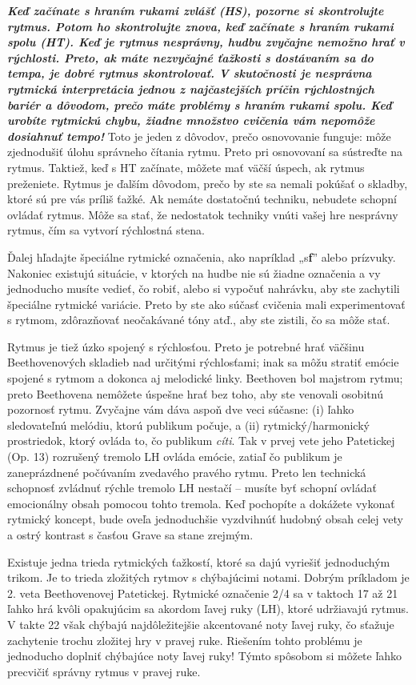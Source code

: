 \documentclass[11pt,a4paper%
]{book}
\begin{document}
\emph{\textbf{Keď začínate s hraním rukami zvlášť (HS), pozorne si skontrolujte rytmus. Potom ho skontrolujte znova, keď začínate s hraním rukami spolu (HT). Keď je rytmus nesprávny, hudbu zvyčajne nemožno hrať v rýchlosti. Preto, ak máte nezvyčajné ťažkosti s dostávaním sa do tempa, je dobré rytmus skontrolovať. V skutočnosti je nesprávna rytmická interpretácia jednou z najčastejších príčin rýchlostných bariér a dôvodom, prečo máte problémy s hraním rukami spolu. Keď urobíte rytmickú chybu, žiadne množstvo cvičenia vám nepomôže dosiahnuť tempo!}} Toto je jeden z dôvodov, prečo osnovovanie funguje: môže zjednodušiť úlohu správneho čítania rytmu. Preto pri osnovovaní sa sústreďte na rytmus. Taktiež, keď s HT začínate, môžete mať väčší úspech, ak rytmus preženiete. Rytmus je ďalším dôvodom, prečo by ste sa nemali pokúšať o skladby, ktoré sú pre vás príliš ťažké. Ak nemáte dostatočnú techniku, nebudete schopní ovládať rytmus. Môže sa stať, že nedostatok techniky vnúti vašej hre nesprávny rytmus, čím sa vytvorí rýchlostná stena.

Ďalej hľadajte špeciálne rytmické označenia, ako napríklad „s\textbf{f}” alebo prízvuky. Nakoniec existujú situácie, v ktorých na hudbe nie sú žiadne označenia a vy jednoducho musíte vedieť, čo robiť, alebo si vypočuť nahrávku, aby ste zachytili špeciálne rytmické variácie. Preto by ste ako súčasť cvičenia mali experimentovať s rytmom, zdôrazňovať neočakávané tóny atď., aby ste zistili, čo sa môže stať.

Rytmus je tiež úzko spojený s rýchlosťou. Preto je potrebné hrať väčšinu Beethovenových skladieb nad určitými rýchlosťami; inak sa môžu stratiť emócie spojené s rytmom a dokonca aj melodické linky. Beethoven bol majstrom rytmu; preto Beethovena nemôžete úspešne hrať bez toho, aby ste venovali osobitnú pozornosť rytmu. Zvyčajne vám dáva aspoň dve veci súčasne: (i) ľahko sledovateľnú melódiu, ktorú publikum počuje, a (ii) rytmický/harmonický prostriedok, ktorý ovláda to, čo publikum \emph{cíti}. Tak v prvej vete jeho Patetickej (Op. 13) rozrušený tremolo LH ovláda emócie, zatiaľ čo publikum je zaneprázdnené počúvaním zvedavého pravého rytmu. Preto len technická schopnosť zvládnuť rýchle tremolo LH nestačí -- musíte byť schopní ovládať emocionálny obsah pomocou tohto tremola. Keď pochopíte a dokážete vykonať rytmický koncept, bude oveľa jednoduchšie vyzdvihnúť hudobný obsah celej vety a ostrý kontrast s časťou Grave sa stane zrejmým.

Existuje jedna trieda rytmických ťažkostí, ktoré sa dajú vyriešiť jednoduchým trikom. Je to trieda zložitých rytmov s chýbajúcimi notami. Dobrým príkladom je 2. veta Beethovenovej Patetickej. Rytmické označenie 2/4 sa v taktoch 17 až 21 ľahko hrá kvôli opakujúcim sa akordom ľavej ruky (LH), ktoré udržiavajú rytmus. V takte 22 však chýbajú najdôležitejšie akcentované noty ľavej ruky, čo sťažuje zachytenie trochu zložitej hry v pravej ruke. Riešením tohto problému je jednoducho doplniť chýbajúce noty ľavej ruky! Týmto spôsobom si môžete ľahko precvičiť správny rytmus v pravej ruke.
\end{document}
